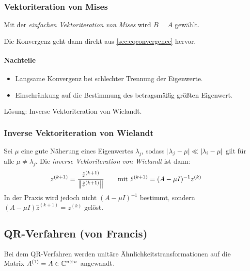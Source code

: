             \subsubsection{Vektoriteration von Mises}
	            Mit der \textit{einfachen Vektoriteration von Mises} wird \( B = A \) gewählt.
	            
	            Die Konvergenz geht dann direkt aus \ref{sec:eqconvergence} hervor.
	            
	            \paragraph{Nachteile}
		            \begin{itemize}
		            	\item Langsame Konvergenz bei schlechter Trennung der Eigenwerte.
		            	\item Einschränkung auf die Bestimmung des betragsmäßig größten Eigenwert.
		            \end{itemize}
		            Lösung: Inverse Vektoriteration von Wielandt.

            \subsubsection{Inverse Vektoriteration von Wielandt}
                Sei \( \mu \) eine gute Näherung eines Eigenwertes \( \lambda_j \), sodass \( \abs{\lambda_j - \mu} \ll \abs{\lambda_i - \mu} \) gilt für alle \( \mu \neq \lambda_j \). Die \textit{inverse Vektoriteration von Wielandt} ist dann:
                \begin{equation*}
	                z^{(k+1)} = \frac{\hat{z}^{(k+1)}}{\norm{\hat{z}^{(k+1)}}} \qquad \textrm{mit } \hat{z}^{(k+1)} = (A - \mu I)^{-1} z^{(k)}
                \end{equation*}
                In der Praxis wird jedoch nicht \( (A - \mu I)^{-1} \) bestimmt, sondern \( (A - \mu I) \hat{z}^{(k+1)} = z^{(k)} \) gelöst.
                

        \subsection{QR-Verfahren (von Francis)}
            Bei dem QR-Verfahren werden unitäre Ähnlichkeitstransformationen auf die Matrix \( A^{(1)} = A \in \mathbb{C}^{n \times n} \) angewandt.
            
